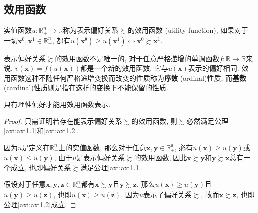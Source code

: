 \documentclass[cn, 12pt, math=mtpro2, bibstyle=apa, blue, twocol]{elegantbook}
\newcommand{\R}{\mathbb{R}}
\newcommand{\x}{\mathbf{x}}
\begin{document}
\subsection{效用函数}
\begin{definition}
实值函数$u:\R_+^n\to\R$称为表示偏好关系$\succsim$的效用函数 (utility function), 如果对于一切$\x^0, \x^1\in\R^n_+$, 都有$u(\x^0)\ge u(\x^1)\Leftrightarrow \x^0\succsim\x^1$.
\end{definition}
表示偏好关系$\succsim$的效用函数不是唯一的, 对于任意严格递增的单调函数$f:\R\to\R$来说, $v(\x)=f(u(\x))$都是一个新的效用函数, 它与$u(\x)$表示的偏好相同. 效用函数这种不随任何严格递增变换而改变的性质称为\textbf{序数} (ordinal)性质, 而\textbf{基数} (cardinal)性质则是指在这样的变换下不能保留的性质.

\begin{proposition}
只有理性偏好才能用效用函数表示.
\end{proposition}
\begin{proof}
 只需证明若存在能表示偏好关系$\succsim$的效用函数, 则$\succsim$必然满足公理\ref{axi:axi1.1}和\ref{axi:axi1.2}.

 因为$u$是定义在$\R_+^n$上的实值函数, 那么对于任意$\x,\mathbf{y}\in\R_+^n$, 必有$u(\x)\ge u(\mathbf{y})$或$u(\x)\le u(\mathbf{y})$, 由于$u$是表示偏好关系$\succsim$的效用函数, 因此$\x\succsim \mathbf{y}$和$\mathbf{y}\succsim\x$总有一个成立, 也即偏好关系$\succsim$满足公理\ref{axi:axi1.1}.

 假设对于任意$\x, \mathbf{y}, \mathbf{z}\in\R_+^n$都有$\x\succsim\mathbf{y}$且$\mathbf{y}\succsim\mathbf{z}$, 那么$u(\x)\ge u(\mathbf{y})$且$u(\mathbf{y})\ge u(\mathbf{z})$, 也即$u(\x)\ge u(\mathbf{z})$, 因为$u$表示了偏好关系$\succsim$, 故而$\x\succsim\mathbf{z}$, 也即公理\ref{axi:axi1.2}成立.
\end{proof}
\end{document}
